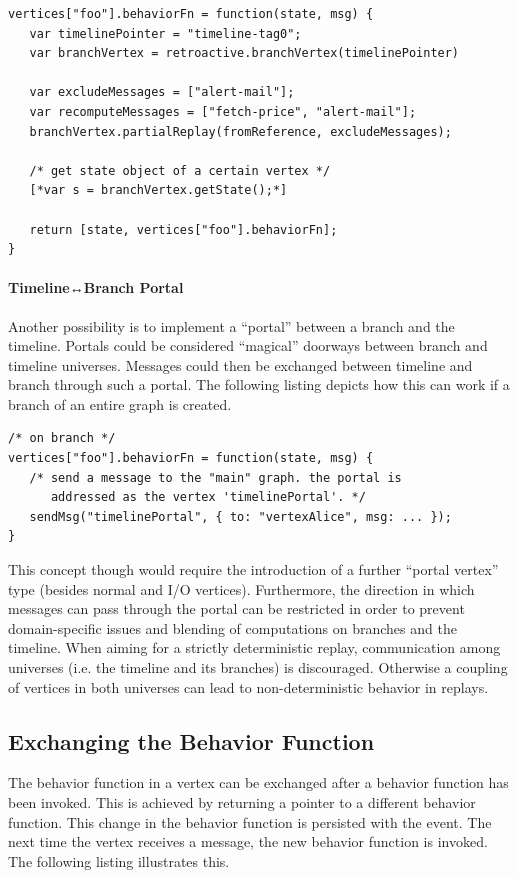 \begin{lstlisting}[style=styled]
vertices["foo"].behaviorFn = function(state, msg) {
   var timelinePointer = "timeline-tag0";
   var branchVertex = retroactive.branchVertex(timelinePointer)

   var excludeMessages = ["alert-mail"];
   var recomputeMessages = ["fetch-price", "alert-mail"];
   branchVertex.partialReplay(fromReference, excludeMessages);

   /* get state object of a certain vertex */
   [*var s = branchVertex.getState();*]

   return [state, vertices["foo"].behaviorFn];
}
\end{lstlisting}

\paragraph{Timeline↔Branch Portal}
Another possibility is to implement a ``portal'' between a branch and the 
timeline. Portals could be considered ``magical'' doorways between branch 
and timeline universes.
Messages could then be exchanged between timeline and branch through such 
a portal. The following listing depicts how this can work if a branch of 
an entire graph is created.

\begin{lstlisting}[style=styled]
/* on branch */
vertices["foo"].behaviorFn = function(state, msg) {
   /* send a message to the "main" graph. the portal is 
      addressed as the vertex 'timelinePortal'. */
   sendMsg("timelinePortal", { to: "vertexAlice", msg: ... });
}
\end{lstlisting}

This concept though would require the introduction of a further ``portal vertex'' 
type (besides normal and I/O vertices).
Furthermore, the direction in which messages can pass through the portal can 
be restricted in order to prevent domain-specific issues and blending of 
computations on branches and the timeline. When aiming for a strictly 
deterministic replay, communication among universes (i.e. the timeline and its 
branches) is discouraged. Otherwise a coupling of vertices in both universes 
can lead to non-deterministic behavior in replays.

\subsection{Exchanging the Behavior Function}
The behavior function in a vertex can be exchanged after a behavior function
has been invoked.
This is achieved by returning a pointer to a different behavior function. 
This change in the behavior function is persisted with the event. The next 
time the vertex receives a message, the new behavior function is invoked. 
The following listing illustrates this.

